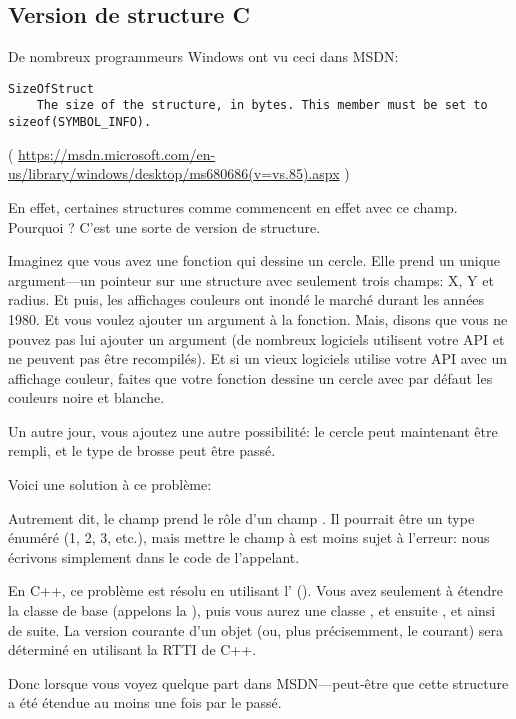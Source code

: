 \subsection{Version de structure C}

De nombreux programmeurs Windows ont vu ceci dans MSDN:

\begin{lstlisting}
SizeOfStruct
    The size of the structure, in bytes. This member must be set to sizeof(SYMBOL_INFO).
\end{lstlisting}

( \url{https://msdn.microsoft.com/en-us/library/windows/desktop/ms680686(v=vs.85).aspx} )

En effet, certaines structures comme  commencent en effet avec ce
champ.  Pourquoi ?
C'est une sorte de version de structure.

Imaginez que vous avez une fonction qui dessine un cercle.
Elle prend un unique argument---un pointeur sur une structure avec seulement trois
champs: X, Y et radius.
Et puis, les affichages couleurs ont inondé le marché durant les années 1980. Et
vous voulez ajouter un argument  à la fonction.
Mais, disons que vous ne pouvez pas lui ajouter un argument (de nombreux logiciels
utilisent votre \ac{API} et ne peuvent pas être recompilés).
Et si un vieux logiciels utilise votre \ac{API} avec un affichage couleur, faites
que votre fonction dessine un cercle avec par défaut les couleurs noire et blanche.

Un autre jour, vous ajoutez une autre possibilité: le cercle peut maintenant être
rempli, et le type de brosse peut être passé.

Voici une solution à ce problème:



Autrement dit, le champ  prend le rôle d'un champ .
Il pourrait être un type énuméré (1, 2, 3, etc.), mais mettre le champ 
à  est moins sujet à l'erreur: nous écrivons simplement 
dans le code de l'appelant.

En C++, ce problème est résolu en utilisant l' ().
Vous avez seulement à étendre la classe de base (appelons la ), puis vous
aurez une classe , et ensuite , et ainsi
de suite.
La version courante d'un objet (ou, plus précisemment, le  courant) sera
déterminé en utilisant la \ac{RTTI} de C++.

Donc lorsque vous voyez  quelque part dans \ac{MSDN}---peut-être
que cette structure a été étendue au moins une fois par le passé.

